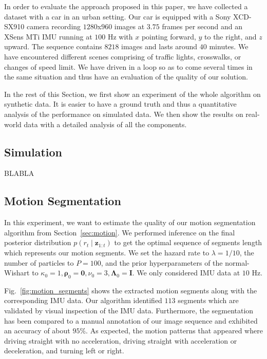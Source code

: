 In order to evaluate the approach proposed in this paper, we have collected
a dataset with a car in an urban setting. Our car is equipped with a Sony
XCD-SX910 camera recording $1280$x$960$ images at $3.75$ frames per second and
an XSens MTi IMU running at $100$ Hz with $x$ pointing forward, $y$ to the
right, and $z$ upward. The sequence contains $8218$ images and lasts around $40$
minutes. We have encountered different scenes comprising of traffic lights,
crosswalks, or changes of speed limit. We have driven in a loop so as to come
several times in the same situation and thus have an evaluation of the quality
of our solution.

In the rest of this Section, we first show an experiment of the whole algorithm
on synthetic data. It is easier to have a ground truth and thus a quantitative
analysis of the performance on simulated data. We then show the results on
real-world data with a detailed analysis of all the components.

\subsection{Simulation}
BLABLA

\subsection{Motion Segmentation}
In this experiment, we want to estimate the quality of our motion segmentation
algorithm from Section~\ref{sec:motion}. We performed inference on the
final posterior distribution $p(r_t\mid \mathbf{z}_{1:t})$ to get the optimal
sequence of segments length which represents our motion segments. We set the
hazard rate to $\lambda=1/10$, the number of particles to $P=100$, and the prior
hyperparameters of the normal-Wishart to $\kappa_0=1,
\boldsymbol{\rho}_0=\mathbf{0},\nu_0=3,\boldsymbol{\Lambda}_0=\mathbf{I}$. We
only considered IMU data at $10$ Hz.

Fig.~\ref{fig:motion_segments} shows the extracted motion segments along with
the corresponding IMU data. Our algorithm identified $113$ segments which are
validated by visual inspection of the IMU data. Furthermore, the segmentation
has been compared to a manual annotation of our image sequence and exhibited an
accuracy of about $95\%$. As expected, the motion patterns that appeared where
driving straight with no acceleration, driving straight with acceleration or
deceleration, and turning left or right.

